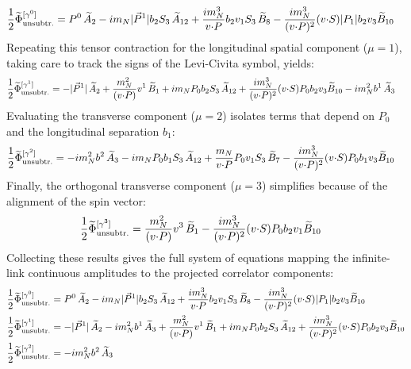 \begin{widetext}
\begin{align}
   \frac{1}{2}\widetilde \Phi^{[\gamma^{0}]}_{\text{unsubtr.}}& = P^0\, \widetilde{A}_2  - i m_N  |\vec{P}^1| b_2 S_3\, \widetilde{A}_{12}+ \frac{ i m_N^3}{v {\cdot} P}  b_2 v_1 S_3\, \widetilde{B}_8- \frac{i m_N^3}{(v {\cdot} P)^2} (v {\cdot} S)  |P_1| b_2 v_3 \widetilde{B}_{10}
\end{align}
Repeating this tensor contraction for the longitudinal spatial component ($\mu = 1$), taking care to track the signs of the Levi-Civita symbol, yields:
\begin{align}
   \frac{1}{2}\widetilde \Phi^{[\gamma^{1}]}_{\text{unsubtr.}} & =-|\vec{P}^1|\, \widetilde{A}_2+ \frac{m_N^2}{(v {\cdot} P)} v^1\, \widetilde{B}_1 
		+ i m_N  P_0 b_2 S_3\, \widetilde{A}_{12}+ \frac{i m_N^3}{(v {\cdot} P)^2} (v {\cdot} S)  P_0 b_2 v_3 \widetilde{B}_{10}- i m_N^2 b^1\, \widetilde{A}_3
\end{align}
Evaluating the transverse component ($\mu=2$) isolates terms that depend on $P_0$ and the longitudinal separation $b_1$:
\begin{align}
  \frac{1}{2}\widetilde \Phi^{[\gamma^2]}_{\text{unsubtr.}} & =- i m_N^2 b^2\, \widetilde{A}_3
		- i m_N  P_0 b_1 S_3\, \widetilde{A}_{12}+ \frac{m_N}{v {\cdot} P}  P_0 v_1 S_3\, \widetilde{B}_7- \frac{i m_N^3}{(v {\cdot} P)^2} (v {\cdot} S) P_0 b_1 v_3 \widetilde{B}_{10}
\end{align}
Finally, the orthogonal transverse component ($\mu=3$) simplifies because of the alignment of the spin vector:
\begin{align}
  \frac{1}{2}\widetilde \Phi^{[\gamma^3]}_{\text{unsubtr.}}& = \frac{m_N^2}{(v {\cdot} P)} v^3\, \widetilde{B}_1- \frac{i m_N^3}{(v {\cdot} P)^2} (v {\cdot} S)  P_0 b_2 v_1 \widetilde{B}_{10}
\end{align}
Collecting these results gives the full system of equations mapping the infinite-link continuous amplitudes to the projected correlator components:
\begin{align}
    \frac{1}{2}\widetilde \Phi^{[\gamma^{0}]}_{\unsub}& = P^0\, \tAmp_2  - i \mN  |\vec{P}^1| \bvec_2 S_3\, \tAmp_{12}+ \frac{ i \mN^3}{v \tcdot P}  \bvec_2 v_1 S_3\, \tBmp_8- \frac{i \mN^3}{(v \tcdot P)^2} (v \tcdot S)  |P_1| \bvec_2 v_3 \tBmp_{10}\\
    \frac{1}{2}\widetilde \Phi^{[\gamma^{1}]}_{\unsub} & =-|\vec{P}^1|\, \tAmp_2- i \mN^2 \bvec^1\, \tAmp_3+ \frac{\mN^2}{(v \tcdot P)} v^1\, \tBmp_1 
		+ i \mN  P_0 \bvec_2 S_3\, \tAmp_{12}+ \frac{i \mN^3}{(v \tcdot P)^2} (v \tcdot S)  P_0 \bvec_2 v_3 \tBmp_{10}\\
   \frac{1}{2}\widetilde \Phi^{[\gamma^2]}_{\unsub} & =- i \mN^2 \bvec^2\, \tAmp_3

\end{align}
\end{widetext}
